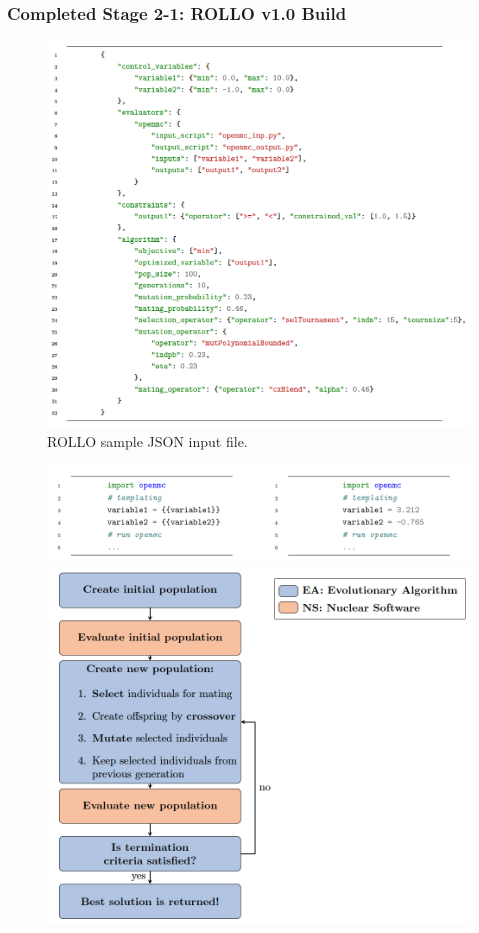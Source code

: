 \begin{frame}
    \frametitle{Completed Stage 2-1: ROLLO v1.0 Build}
    \begin{minipage}[c]{0.6\textwidth}
    \begin{figure}
        \centering
        \includegraphics[width=\linewidth]{figures/rollo-json-input.png} 
        \caption{ROLLO sample JSON input file.}
    \end{figure}
\end{minipage}\hfill
\begin{minipage}[c]{0.4\textwidth}
    \centering
    \begin{figure}
        \includegraphics[width=\linewidth]{figures/openmc-template.png}
        \vspace{0.3cm}
        \includegraphics[width=\linewidth]{figures/rollo-flow.png} 

\end{figure}
\end{minipage}
\end{frame}
